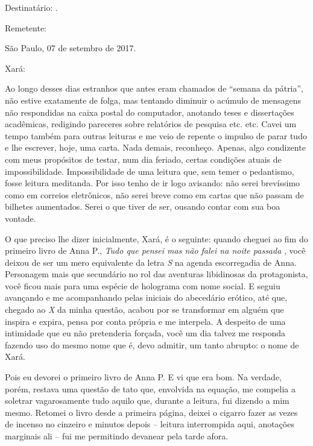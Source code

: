 

\noindent\dotfill

\noindent Destinatário: .

\noindent Remetente: 
\bigskip


\hfill São Paulo, 07 de setembro de 2017.
\medskip

\noindent Xará:
\smallskip

\noindent Ao longo desses dias estranhos que antes eram chamados de ``semana da
pátria'', não estive exatamente de folga, mas tentando diminuir o
acúmulo de mensagens não respondidas na caixa postal do computador,
anotando teses e dissertações acadêmicas, redigindo pareceres sobre
relatórios de pesquisa etc. etc. Cavei um tempo também para outras
leituras e me veio de repente o impulso de parar tudo e lhe escrever,
hoje, uma carta. Nada demais, reconheço. Apenas, algo condizente com
meus propósitos de testar, num dia feriado, certas condições atuais de
impossibilidade. Impossibilidade de uma leitura que, sem temer o
pedantismo, fosse leitura meditanda. Por isso tenho de ir logo avisando:
não serei brevíssimo como em correios eletrônicos, não serei breve como
em cartas que não passam de bilhetes aumentados. Serei o que tiver de
ser, ousando contar com sua boa vontade.

O que preciso lhe dizer inicialmente, Xará, é o seguinte: quando cheguei
ao fim do primeiro livro de Anna P., \emph{Tudo que pensei mas não falei
na noite passada} , você deixou de ser um mero equivalente da letra
\emph{S} na agenda escorregadia de Anna. Personagem mais que secundário
no rol das aventuras libidinosas da protagonista, você ficou mais para
uma espécie de holograma com nome social. E seguiu avançando e me
acompanhando pelas iniciais do abecedário erótico, até que, chegado ao
\emph{X} da minha questão, acabou por se transformar em alguém que
inspira e expira, pensa por conta própria e me interpela. A despeito de
uma intimidade que eu não pretenderia forçada, você um dia talvez me
responda fazendo uso do mesmo nome que é, devo admitir, um tanto
abrupto: o nome de Xará.

Pois eu devorei o primeiro livro de Anna P. E vi que era bom. Na
verdade, porém, restava uma questão de tato que, envolvida na equação,
me compelia a soletrar vagarosamente tudo aquilo que, durante a leitura,
fui dizendo a mim mesmo. Retomei o livro desde a primeira página, deixei
o cigarro fazer as vezes de incenso no cinzeiro e minutos depois --
leitura interrompida aqui, anotações marginais ali -- fui me permitindo
devanear pela tarde afora.

